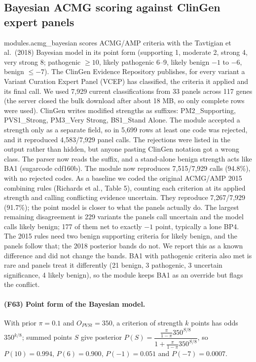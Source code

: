 \subsection{Bayesian ACMG scoring against ClinGen expert panels}
modules.acmg\_bayesian scores ACMG/AMP criteria with the Tavtigian et al.\ (2018) Bayesian model in its point form (supporting 1, moderate 2, strong 4, very strong 8; pathogenic $\ge10$, likely pathogenic 6--9, likely benign $-1$ to $-6$, benign $\le-7$). The ClinGen Evidence Repository publishes, for every variant a Variant Curation Expert Panel (VCEP) has classified, the criteria it applied and its final call. We used 7,929 current classifications from 33 panels across 117 genes (the server closed the bulk download after about 18 MB, so only complete rows were used). ClinGen writes modified strengths as suffixes: PM2\_Supporting, PVS1\_Strong, PM3\_Very Strong, BS1\_Stand Alone. The module accepted a strength only as a separate field, so in 5,699 rows at least one code was rejected, and it reproduced 4,583/7,929 panel calls. The rejections were listed in the output rather than hidden, but anyone pasting ClinGen notation got a wrong class. The parser now reads the suffix, and a stand-alone benign strength acts like BA1 (sugarcode cdf160b). The module now reproduces 7,515/7,929 calls (94.8\%), with no rejected codes.
As a baseline we coded the original ACMG/AMP 2015 combining rules (Richards et al., Table 5), counting each criterion at its applied strength and calling conflicting evidence uncertain. They reproduce 7,267/7,929 (91.7\%); the point model is closer to what the panels actually do. The largest remaining disagreement is 229 variants the panels call uncertain and the model calls likely benign; 177 of them net to exactly $-1$ point, typically a lone BP4. The 2015 rules need two benign supporting criteria for likely benign, and the panels follow that; the 2018 posterior bands do not. We report this as a known difference and did not change the bands. BA1 with pathogenic criteria also met is rare and panels treat it differently (21 benign, 3 pathogenic, 3 uncertain significance, 4 likely benign), so the module keeps BA1 as an override but flags the conflict.
\paragraph{(F63) Point form of the Bayesian model.} With prior $\pi=0.1$ and $O_{PVSt}=350$, a criterion of strength $k$ points has odds $350^{k/8}$; summed points $S$ give posterior $P(S)=\dfrac{\tfrac{\pi}{1-\pi}350^{S/8}}{1+\tfrac{\pi}{1-\pi}350^{S/8}}$, so $P(10)=0.994$, $P(6)=0.900$, $P(-1)=0.051$ and $P(-7)=0.0007$.
